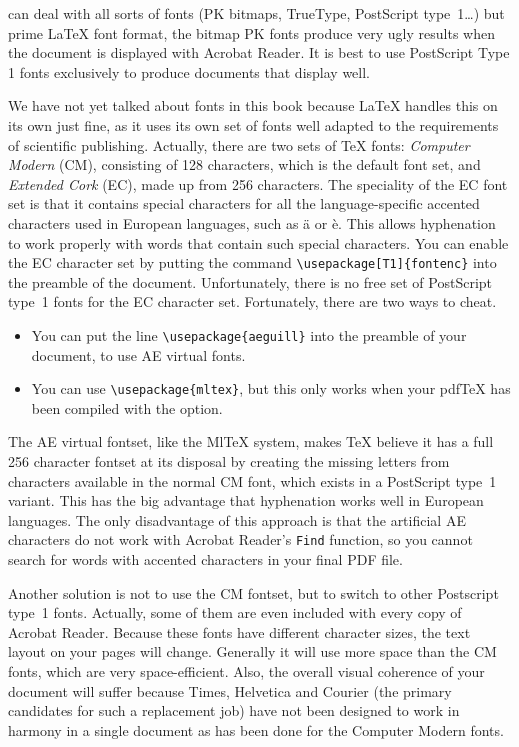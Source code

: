 \documentclass[twoside,11pt,letterpaper]{article}
\begin{document}
 can deal with all sorts of fonts (PK bitmaps, TrueType,
PostScript type~1\dots) but prime \LaTeX{} font format, the bitmap PK
fonts produce very ugly results when the document is displayed
with Acrobat Reader. It is best to use PostScript Type 1 fonts
exclusively to produce documents that display well.

We have not yet talked about fonts in this book because \LaTeX{}
handles this on its own just fine, as it uses its own set of fonts well
adapted to the requirements of scientific publishing.
Actually, there are two sets of \TeX{} fonts: 
\emph{Computer Modern} (CM), consisting of 128 characters, which is the
default font set, and \emph{Extended Cork} (EC), made up from 256
characters. The speciality of the EC font set is that it contains
special characters for all the language-specific accented characters
used in European languages, such as
\"a or \`e. This allows hyphenation to work properly with words
that contain such special characters. You can enable the EC character
set by putting the command \verb+\usepackage[T1]{fontenc}+ into the
preamble of the document.%
Unfortunately, there is no free set of PostScript type~1 fonts
for the EC character set. Fortunately, there are two ways to cheat.
\begin{itemize}
\item You can put the line \verb+\usepackage{aeguill}+ into the
  preamble of your document, to use AE virtual fonts. 
\item You can use \verb+\usepackage{mltex}+, but this only works when
  your pdf\TeX{} has been compiled with the  option.
\end{itemize}
The AE virtual fontset, like the {Ml\TeX} system, makes \TeX{} believe
it has a full 256 character fontset at its disposal by creating the
missing letters from characters available in the normal CM font, which
exists in a PostScript type~1 variant. This has the big advantage that
hyphenation works well in European languages. 
The only disadvantage of this approach is that the artificial AE
characters do not work with Acrobat Reader's 
\texttt{Find} function, so you cannot search for words with accented
characters in your final PDF file.

Another solution is not to use the CM fontset, but to switch to other
Postscript type~1 fonts. Actually, some of them are even included with
every copy of Acrobat Reader. Because these fonts have different
character sizes, the text layout on your pages will change. Generally
it will use more space than the CM fonts, which are very space-efficient. 
Also, the overall visual coherence of your document will
suffer because Times, Helvetica and Courier (the primary candidates
for such a replacement job) have not been designed to work in harmony in
a single document as has been done for the Computer Modern fonts.
 
\end{document}
